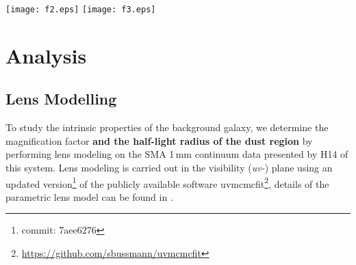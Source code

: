 \documentclass[iop]{emulateapj}
\newcommand{\CO}{\mbox{CO($J$\,=\,3\,$\rightarrow$\,2) }}
\newcommand{\pmOne}{\mbox{$^{-1}$}}
\begin{document}
\begin{figure*}[tbph]
\centering
\texttt{[image: f2.eps]}
\texttt{[image: f3.eps]}
\caption{Top Left: Continuum-subtracted moment-0 map of \CO line emission toward
the background SMG with $\sigma$\,=\,1.03\,Jy\,\,km\,\,s\pmOne\ beam\pmOne\ over a velocity range of $\Delta v$\,$\sim$\,514\,km\,\,s\pmOne. The beam size is 11$\farcs$5\,$\times$\,6, at P.A.\,=\,$-$56\degr, as indicated in the bottom left corner.
Top Right: Velocity-integrated \CO line emission (red contours) overlaid on the SMA 1\,mm dust continuum (green contours and grayscale; H14), with an rms noise of $\sigma_\textrm{1\,mm}$\,=\,0.84 mJy beam\pmOne. The beam size of the SMA observations is 1$ \times $1, P.A. $-$34\degr, as shown
in the bottom left corner.
The central cross on each image corresponds to the same coordinates as in Figure~\ref{fig:cont}. The contour levels 
in both images
start at $\pm$3$\sigma$, incrementing at
steps of $\pm$1$\sigma$.
Bottom:
Spectrum extracted at the peak position of CO line emission, with a spectral resolution of $\Delta v$ $\sim$\,29 km\,\,s\pmOne, and an rms of $\sigma_\textrm{ch}$\,=\,9.5 mJy beam\pmOne\ per channel. The
solid black line shows a Gaussian fit to the \CO line profile, where the velocity scale is relative to $z$\,=\,2.221.
\label{fig:mom0}}
\end{figure*}


\section{Analysis}
\subsection{Lens Modelling} \label{sec:Lens}
To study the intrinsic properties of the background galaxy, we determine the magnification factor {\bf and the half-light radius of the dust region} by performing
lens modeling on the SMA 1\,mm continuum data presented by H14 of this system. Lens modeling is carried out in the visibility
({\it uv-}) plane using an updated version\footnote{commit: 7aee6276} of the publicly available software {\sc uvmcmcfit}\footnote{\url{https://github.com/sbussmann/uvmcmcfit}}, details of the parametric lens model can be found in \citet{Bussmann15a}. 
\end{document}
